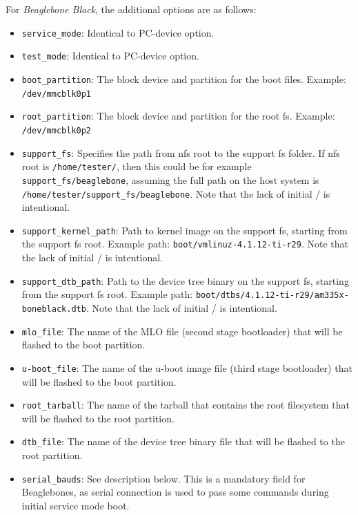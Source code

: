 \documentclass[a4paper,11pt]{article}
\newcommand{\cmd}[1]{\texttt{#1}}
\begin{document}
For \emph{Beaglebone Black}, the additional options are as follows:
\begin{itemize}
\item \cmd{service\_mode}: Identical to PC-device option.

\item \cmd{test\_mode}: Identical to PC-device option.

\item \cmd{boot\_partition}: The block device and partition for the boot files. Example: \cmd{/dev/mmcblk0p1}

\item \cmd{root\_partition}: The block device and partition for the root fs. Example: \cmd{/dev/mmcblk0p2}

\item \cmd{support\_fs}: Specifies the path from nfs root to the support fs folder. If nfs root is \cmd{/home/tester/}, then this could be for example \cmd{support\_fs/beaglebone}, assuming the full path on the host system is \cmd{/home/tester/support\_fs/beaglebone}. Note that the lack of initial / is intentional.

\item \cmd{support\_kernel\_path}: Path to kernel image on the support fs, starting from the support fs root. Example path: \cmd{boot/vmlinuz-4.1.12-ti-r29}. Note that the lack of initial / is intentional.

\item \cmd{support\_dtb\_path}: Path to the device tree binary on the support fs, starting from the support fs root. Example path: \cmd{boot/dtbs/4.1.12-ti-r29/am335x-boneblack.dtb}. Note that the lack of initial / is intentional.

\item \cmd{mlo\_file}: The name of the MLO file (second stage bootloader) that will be flashed to the boot partition.

\item \cmd{u-boot\_file}: The name of the u-boot image file (third stage bootloader) that will be flashed to the boot partition.

\item \cmd{root\_tarball}: The name of the tarball that contains the root filesystem that will be flashed  to the root partition.

\item \cmd{dtb\_file}: The name of the device tree binary file that will be flashed to the root partition.

\item \cmd{serial\_bauds}: See description below. This is a mandatory field for Beaglebones, as serial connection is used to pass some commands during initial service mode boot.

\end{itemize}
\end{document}
